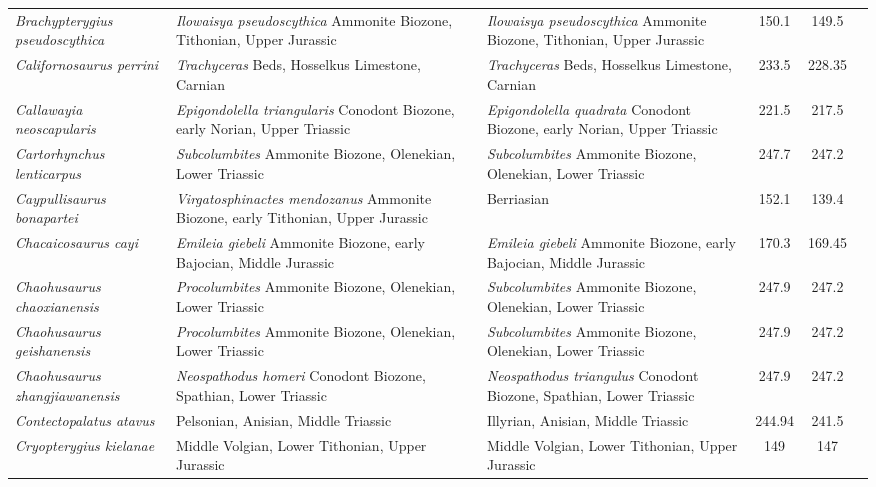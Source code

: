 \begin{longtabu}{>{\itshape}lXXSSl}
	Brachypterygius pseudoscythica & \emph{Ilowaisya pseudoscythica} Ammonite Biozone, Tithonian, Upper Jurassic & \emph{Ilowaisya pseudoscythica} Ammonite Biozone, Tithonian, Upper Jurassic & 150.1 & 149.5 & \cite{Efimov1998} \\
	Californosaurus perrini & \emph{Trachyceras} Beds, Hosselkus Limestone, Carnian & \emph{Trachyceras} Beds, Hosselkus Limestone, Carnian & 233.5 & 228.35 & \cite{Merriam1902,Merriam1908} \\
	Callawayia neoscapularis & \emph{Epigondolella triangularis} Conodont Biozone, early Norian, Upper Triassic & \emph{Epigondolella quadrata} Conodont Biozone, early Norian, Upper Triassic & 221.5 & 217.5 & \cite{McGowan1994a} \\
	Cartorhynchus lenticarpus & \emph{Subcolumbites} Ammonite Biozone, Olenekian, Lower Triassic & \emph{Subcolumbites} Ammonite Biozone, Olenekian, Lower Triassic & 247.7 & 247.2 & \cite{Motani2014a} \\
	Caypullisaurus bonapartei & \emph{Virgatosphinactes mendozanus} Ammonite Biozone, early Tithonian, Upper Jurassic & Berriasian & 152.1 & 139.4 & \cite{Fernandez1997a} \\
	Chacaicosaurus cayi & \emph{Emileia giebeli} Ammonite Biozone, early Bajocian, Middle Jurassic & \emph{Emileia giebeli} Ammonite Biozone, early Bajocian, Middle Jurassic & 170.3 & 169.45 & \cite{Fernandez1994} \\
	Chaohusaurus chaoxianensis & \emph{Procolumbites} Ammonite Biozone, Olenekian, Lower Triassic & \emph{Subcolumbites} Ammonite Biozone, Olenekian, Lower Triassic & 247.9 & 247.2 & \cite{Motani2014,Motani2015} \\
	Chaohusaurus geishanensis & \emph{Procolumbites} Ammonite Biozone, Olenekian, Lower Triassic & \emph{Subcolumbites} Ammonite Biozone, Olenekian, Lower Triassic & 247.9 & 247.2 & \cite{Motani2014a,Motani2015} \\
	Chaohusaurus zhangjiawanensis & \emph{Neospathodus homeri} Conodont Biozone, Spathian, Lower Triassic & \emph{Neospathodus triangulus} Conodont Biozone, Spathian, Lower Triassic & 247.9 & 247.2 & \cite{Chen2013} \\
	Contectopalatus atavus & Pelsonian, Anisian, Middle Triassic & Illyrian, Anisian, Middle Triassic & 244.94 & 241.5 & \cite{Liu2013} \\
	Cryopterygius kielanae & Middle Volgian, Lower Tithonian, Upper Jurassic & Middle Volgian, Lower Tithonian, Upper Jurassic & 149 & 147 & \cite{Tyborowski2016} \\

\end{longtabu}
